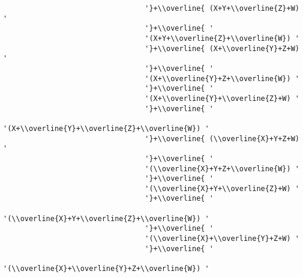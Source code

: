 \begin{verbatim}
                                 '}+\\overline{ (X+Y+\\overline{Z}+W) '
                                 '}+\\overline{ '
                                 '(X+Y+\\overline{Z}+\\overline{W}) '
                                 '}+\\overline{ (X+\\overline{Y}+Z+W) '
                                 '}+\\overline{ '
                                 '(X+\\overline{Y}+Z+\\overline{W}) '
                                 '}+\\overline{ '
                                 '(X+\\overline{Y}+\\overline{Z}+W) '
                                 '}+\\overline{ '
                                 '(X+\\overline{Y}+\\overline{Z}+\\overline{W}) '
                                 '}+\\overline{ (\\overline{X}+Y+Z+W) '
                                 '}+\\overline{ '
                                 '(\\overline{X}+Y+Z+\\overline{W}) '
                                 '}+\\overline{ '
                                 '(\\overline{X}+Y+\\overline{Z}+W) '
                                 '}+\\overline{ '
                                 '(\\overline{X}+Y+\\overline{Z}+\\overline{W}) '
                                 '}+\\overline{ '
                                 '(\\overline{X}+\\overline{Y}+Z+W) '
                                 '}+\\overline{ '
                                 '(\\overline{X}+\\overline{Y}+Z+\\overline{W}) '

\end{verbatim}
